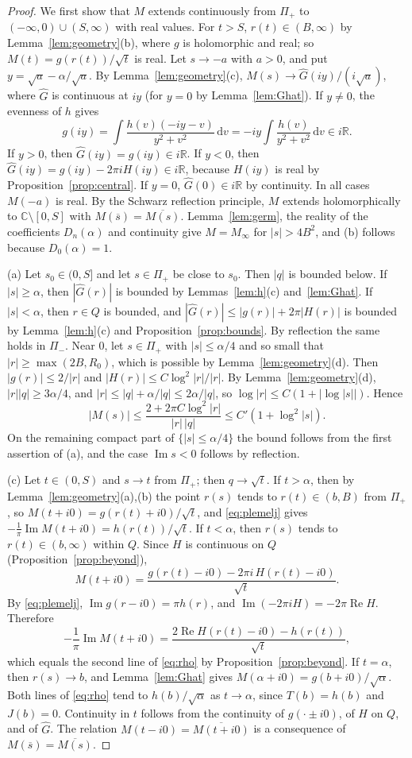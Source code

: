 \documentclass[11pt]{amsart}
\numberwithin{equation}{section}
\theoremstyle{definition}
\theoremstyle{remark}
\newcommand{\C}{\mathbb{C}}
\newcommand{\R}{\mathbb{R}}
\newcommand{\Pim}{\Pi_{-}}
\newcommand{\Pip}{\Pi_{+}}
\newcommand{\dd}{\,\mathrm{d}}
\DeclareMathOperator{\re}{Re}
\DeclareMathOperator{\im}{Im}
\begin{document}
\begin{proof}
We first show that $M$ extends continuously from $\Pip$ to
$(-\infty,0)\cup(S,\infty)$ with real values. For $t>S$, $r(t)\in(B,\infty)$
by Lemma~\ref{lem:geometry}(b), where $g$ is holomorphic and real; so
$M(t)=g(r(t))/\sqrt t$ is real. Let $s\to-a$ with $a>0$, and put
$y=\sqrt a-\alpha/\sqrt a$. By Lemma~\ref{lem:geometry}(c),
$M(s)\to\widehat G(iy)/(i\sqrt a)$, where $\widehat G$ is continuous at $iy$
(for $y=0$ by Lemma~\ref{lem:Ghat}). If $y\ne0$, the evenness of $h$ gives
\[
g(iy)=\int\frac{h(v)(-iy-v)}{y^2+v^2}\dd v=-iy\int\frac{h(v)}{y^2+v^2}\dd v\in i\R .
\]
If $y>0$, then $\widehat G(iy)=g(iy)\in i\R$. If $y<0$, then
$\widehat G(iy)=g(iy)-2\pi iH(iy)\in i\R$, because $H(iy)$ is real by
Proposition~\ref{prop:central}. If $y=0$, $\widehat G(0)\in i\R$ by
continuity. In all cases $M(-a)$ is real. By the Schwarz reflection principle,
$M$ extends holomorphically to $\C\setminus[0,S]$ with
$M(\overline s)=\overline{M(s)}$. Lemma~\ref{lem:germ}, the reality of the
coefficients $D_n(\alpha)$ and continuity give $M=M_\infty$ for $|s|>4B^2$,
and (b) follows because $D_0(\alpha)=1$.

(a) Let $s_0\in(0,S]$ and let $s\in\Pip$ be close to $s_0$. Then $|q|$ is
bounded below. If $|s|\ge\alpha$, then $|\widehat G(r)|$ is bounded by
Lemmas~\ref{lem:h}(c) and~\ref{lem:Ghat}. If $|s|<\alpha$, then $r\in Q$ is
bounded, and $|\widehat G(r)|\le|g(r)|+2\pi|H(r)|$ is bounded by
Lemma~\ref{lem:h}(c) and Proposition~\ref{prop:bounds}. By reflection the same
holds in $\Pim$. Near $0$, let $s\in\Pip$ with $|s|\le\alpha/4$ and so small
that $|r|\ge\max(2B,R_0)$, which is possible by Lemma~\ref{lem:geometry}(d).
Then $|g(r)|\le2/|r|$ and $|H(r)|\le C\log^2|r|/|r|$. By
Lemma~\ref{lem:geometry}(d), $|r||q|\ge3\alpha/4$, and
$|r|\le|q|+\alpha/|q|\le2\alpha/|q|$, so $\log|r|\le C(1+|\log|s||)$. Hence
\[
|M(s)|\le\frac{2+2\pi C\log^2|r|}{|r|\,|q|}\le C'(1+\log^2|s|) .
\]
On the remaining compact part of $\{|s|\le\alpha/4\}$ the bound follows from
the first assertion of (a), and the case $\im s<0$ follows by reflection.

(c) Let $t\in(0,S)$ and $s\to t$ from $\Pip$; then $q\to\sqrt t$. If
$t>\alpha$, then by Lemma~\ref{lem:geometry}(a),(b) the point $r(s)$ tends to
$r(t)\in(b,B)$ from $\Pip$, so $M(t+i0)=g(r(t)+i0)/\sqrt t$, and
\eqref{eq:plemelj} gives $-\frac1\pi\im M(t+i0)=h(r(t))/\sqrt t$. If
$t<\alpha$, then $r(s)$ tends to $r(t)\in(b,\infty)$ within $Q$. Since $H$
is continuous on $Q$ (Proposition~\ref{prop:beyond}),
\[
M(t+i0)=\frac{g(r(t)-i0)-2\pi i\,H(r(t)-i0)}{\sqrt t} .
\]
By \eqref{eq:plemelj}, $\im g(r-i0)=\pi h(r)$, and
$\im(-2\pi iH)=-2\pi\re H$. Therefore
\[
-\frac1\pi\im M(t+i0)=\frac{2\re H(r(t)-i0)-h(r(t))}{\sqrt t},
\]
which equals the second line of \eqref{eq:rho} by
Proposition~\ref{prop:beyond}. If $t=\alpha$, then $r(s)\to b$, and
Lemma~\ref{lem:Ghat} gives $M(\alpha+i0)=g(b+i0)/\sqrt\alpha$. Both lines of
\eqref{eq:rho} tend to $h(b)/\sqrt\alpha$ as $t\to\alpha$, since $T(b)=h(b)$
and $J(b)=0$. Continuity in $t$ follows from the continuity of $g(\cdot\pm
i0)$, of $H$ on $Q$, and of $\widehat G$. The relation
$M(t-i0)=\overline{M(t+i0)}$ is a consequence of $M(\overline
s)=\overline{M(s)}$.
\end{proof}
\end{document}

